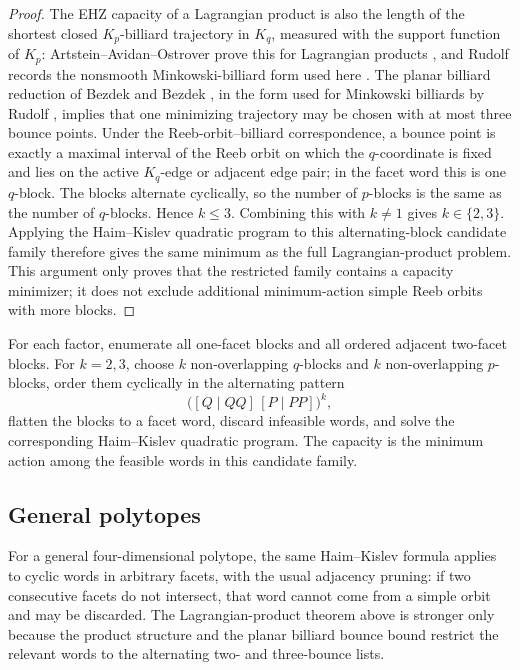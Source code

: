 \begin{proof}
The EHZ capacity of a Lagrangian product is also the length of the shortest
closed \(K_p\)-billiard trajectory in \(K_q\), measured with the support
function of \(K_p\): Artstein--Avidan--Ostrover prove this for Lagrangian
products \cite[Theorem~2.13]{AAO2014}, and Rudolf records the nonsmooth
Minkowski-billiard form used here \cite[Theorem~1]{Rudolf2022}. The planar
billiard reduction of Bezdek and Bezdek
\cite[Theorem~1.1 and Lemma~2.4]{BezdekBezdek2009}, in the form used for
Minkowski billiards by Rudolf \cite[Theorem~1]{Rudolf2022}, implies that one
minimizing trajectory may be chosen with at most three bounce points. Under the
Reeb-orbit--billiard correspondence, a bounce point is exactly a maximal
interval of the Reeb orbit on which the \(q\)-coordinate is fixed and lies on
the active \(K_q\)-edge or adjacent edge pair; in the facet word this is one
\(q\)-block. The blocks alternate cyclically, so the number of \(p\)-blocks is
the same as the number of \(q\)-blocks. Hence \(k\leq 3\). Combining this with
\(k\neq 1\) gives \(k\in\{2,3\}\). Applying the Haim--Kislev quadratic program
to this alternating-block candidate family therefore gives the same minimum as
the full Lagrangian-product problem. This argument only proves that the
restricted family contains a capacity minimizer; it does not exclude additional
minimum-action simple Reeb orbits with more blocks.
\end{proof}

\begin{algorithm}
\label{alg:lagrangian-product-capacity-enumeration}
For each factor, enumerate all one-facet blocks and all ordered adjacent
two-facet blocks. For \(k=2,3\), choose \(k\) non-overlapping \(q\)-blocks and
\(k\) non-overlapping \(p\)-blocks, order them cyclically in the alternating
pattern
\[
  \bigl([Q\mid QQ]\,[P\mid PP]\bigr)^k,
\]
flatten the blocks to a facet word, discard infeasible words, and solve the
corresponding Haim--Kislev quadratic program. The capacity is the minimum action
among the feasible words in this candidate family.
\end{algorithm}

\subsection{General polytopes}
\label{subsec:quadratic-program-algorithm-hk2019-general-polytopes}

For a general four-dimensional polytope, the same Haim--Kislev formula
\cite{HK2017} applies to cyclic words in arbitrary facets, with the usual
adjacency pruning: if two consecutive facets do not intersect, that word cannot
come from a simple orbit and may be discarded. The Lagrangian-product theorem
above is stronger only because the product structure and the planar billiard
bounce bound restrict the relevant words to the alternating two- and
three-bounce lists.

